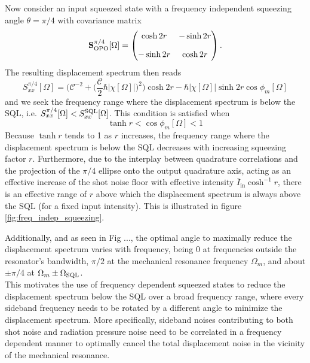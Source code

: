 Now consider an input squeezed state with a frequency independent squeezing angle $\theta=\pi/4$ with covariance matrix
\begin{equation*}
  \mathbf{S}^{\pi/4}_{\rm OPO}[\Omega] = \begin{pmatrix}
         \cosh 2r   & -\sinh 2r  \\[10pt]
        -\sinh 2r  & \cosh 2r  
      \end{pmatrix}.
\end{equation*}
The resulting displacement spectrum then reads
\begin{equation}
  S_{xx}^{\pi/4}[\Omega] = \Bigg(\mathcal{C}^{-2}  + \bigg(\dfrac{\mathcal{C} }{2} \hbar |\chi[\Omega]| \bigg)^2\Bigg)\cosh 2r - \hbar |\chi[\Omega]| \sinh 2r \cos \phi_m[\Omega]
\end{equation}
and we seek the frequency range where the displacement spectrum is below the SQL, i.e. $S_{xx}^{\pi/4}[\Omega] < S_{xx}^{\rm SQL}[\Omega]$. This condition is satisfied when
\begin{equation}
  \tanh r < \cos \phi_m[\Omega] < 1
\end{equation}
Because $\tanh r$ tends to 1 as $r$ increases, the frequency range where the displacement spectrum is below the SQL decreases with increasing squeezing factor $r$. Furthermore, due to the interplay between quadrature correlations and the projection of the $\pi/4$ ellipse onto the output quadrature axis, acting as an effective increase of the shot noise floor with effective intensity $\bar{I}_\mathrm{in} \cosh^{-1} r $, there is an effective range of $r$ above which the displacement spectrum is always above the SQL (for a fixed input intensity). This is illustrated in figure \ref{fig:freq_indep_squeezing}.

Additionally, and as seen in Fig ..., the optimal angle to maximally reduce the displacement spectrum varies with frequency, being 0 at frequencies outside the resonator's bandwidth, $\pi/2$ at the mechanical resonance frequency $\Omega_m$, and about $\pm\pi/4$ at $\Omega_m \pm \Omega_{\rm SQL}$. \\

This motivates the use of frequency dependent squeezed states to reduce the displacement spectrum below the SQL over a broad frequency range, where every sideband frequency needs to be rotated by a different angle to minimize the displacement spectrum. More specifically, sideband noises contributing to both shot noise and radiation pressure noise need to be correlated in a frequency dependent manner to optimally cancel the total displacement noise in the vicinity of the mechanical resonance. 

